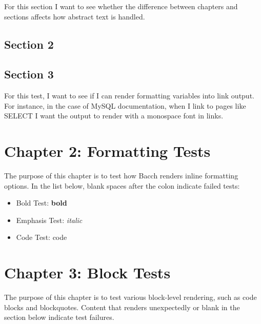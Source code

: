 \documentclass[openright,pdflatex,10pt]{book}
\begin{document}
For this section I want to see whether the difference between chapters and sections affects how abstract text is handled.

\section*{Section 2}
\section*{Section 3}


For this test, I want to see if I can render formatting variables into link output.  For instance, in the case of MySQL documentation, when I link to pages like SELECT I want the output to render with a monospace font in links.

\chapter*{Chapter 2: Formatting Tests}


The purpose of this chapter is to test how Bacch renders inline formatting options.  In the list below, blank spaces after the colon indicate failed tests:


\begin{itemize}
\item

Bold Test: \textbf{bold}
\item

Emphasis Test: \emph{italic}
\item

Code Test: code

\end{itemize}
\chapter*{Chapter 3: Block Tests}


The purpose of this chapter is to test various block-level rendering, such as code blocks and blockquotes.  Content that renders unexpectedly or blank in the section below indicate test failures.
\end{document}
